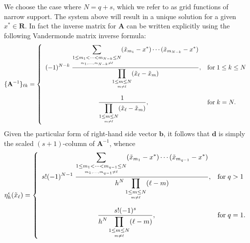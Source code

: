 We choose the case where $N=q+s$, which we refer to as grid functions of narrow support.
The system above will result in a unique solution for a given $x^*\in\mathbf R$.
In fact the inverse matrix for $\mathbf A$ can be written explicitly using the following Vandermonde matrix inverse formula:
\begin{equation*}\label{eq:vandinv}
	\{\mathbf A^{-1} \}_{\ell k} = \left\{ \begin{array}{cl}
		\displaystyle
		(-1)^{N-k} \; 
		\frac{
			\displaystyle
			\sum_{\underset{m_1,...,m_{N-k}\neq \ell}{1\le m_1<\cdots<m_{N-k}\le N}}
			 (\tilde x_{m_1}-x^*) \cdots (\tilde x_{m_{N-k}}-x^*)
		}
		{
			\displaystyle
			\prod_{\underset{m\neq \ell}{1\le m\le N}} (\tilde x_\ell - \tilde x_m)
		}
		,& \text{for} \; 1\le k\le N  \vspace{10pt} \\ 
		\displaystyle
		\frac{
			1
		}
		{
			\displaystyle
			\prod_{\underset{m\neq \ell}{1\le m\le N}} (\tilde x_\ell - \tilde x_m)
		}
		,& \text{for}\; k=N.
	\end{array}\right.
\end{equation*}
Given the particular form of right-hand side vector $\mathbf b$, it follows that $\mathbf d$ is simply the scaled $(s+1)$-column of $\mathbf A^{-1}$, whence
\begin{equation}\label{eq:gridfunsol}
	\eta_h^\epsilon(\tilde x_\ell) = \left\{ \begin{array}{cl}
		\displaystyle
		s! (-1)^{N-1} \; 
		\frac{
			\displaystyle
			\sum_{\underset{m_1,...,m_{q-1}\neq \ell}{1\le m_1<\cdots<m_{q-1}\le N}}
			 (\tilde x_{m_1}-x^*) \cdots (\tilde x_{m_{q-1}}-x^*)
		}
		{
			\displaystyle
			h^{N} \prod_{\underset{m\neq \ell}{1\le m\le N}} (\ell - m)
		}
		,& \text{for} \; q>1  \vspace{10pt} \\ 
		\displaystyle
		\frac{
			s!(-1)^{s}
		}
		{
			\displaystyle
			h^N \prod_{\underset{m\neq \ell}{1\le m\le N}} (\ell - m)
		}
		,& \text{for}\; q=1.
	\end{array}\right.
\end{equation}


